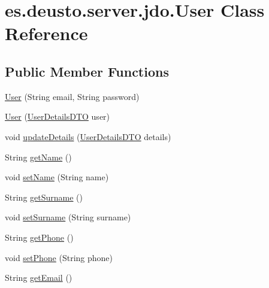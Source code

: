 \hypertarget{classes_1_1deusto_1_1server_1_1jdo_1_1_user}{}\section{es.\+deusto.\+server.\+jdo.\+User Class Reference}
\label{classes_1_1deusto_1_1server_1_1jdo_1_1_user}
\subsection*{Public Member Functions}
\begin{DoxyCompactItemize}
\item 
\mbox{\hyperlink{classes_1_1deusto_1_1server_1_1jdo_1_1_user_a3c1d7bfbedde3bad6bed8ccd3288072d}{User}} (String email, String password)
\item 
\mbox{\hyperlink{classes_1_1deusto_1_1server_1_1jdo_1_1_user_a045d3217e3e459cd505de75ebb88243e}{User}} (\mbox{\hyperlink{classes_1_1deusto_1_1server_1_1data_1_1_user_details_d_t_o}{User\+Details\+D\+TO}} user)
\item 
void \mbox{\hyperlink{classes_1_1deusto_1_1server_1_1jdo_1_1_user_a2abb7df132d0ded1f4187d900416d65d}{update\+Details}} (\mbox{\hyperlink{classes_1_1deusto_1_1server_1_1data_1_1_user_details_d_t_o}{User\+Details\+D\+TO}} details)
\item 
String \mbox{\hyperlink{classes_1_1deusto_1_1server_1_1jdo_1_1_user_ae241c2d5fbef940165041c82dc00edad}{get\+Name}} ()
\item 
void \mbox{\hyperlink{classes_1_1deusto_1_1server_1_1jdo_1_1_user_a1684a5a2d021ec4c3137a46a4e76d0c7}{set\+Name}} (String name)
\item 
String \mbox{\hyperlink{classes_1_1deusto_1_1server_1_1jdo_1_1_user_adc7114247c7881e3f9e0fd14b7905f9a}{get\+Surname}} ()
\item 
void \mbox{\hyperlink{classes_1_1deusto_1_1server_1_1jdo_1_1_user_ae429a21d0538859e2300e94ef0a9257a}{set\+Surname}} (String surname)
\item 
String \mbox{\hyperlink{classes_1_1deusto_1_1server_1_1jdo_1_1_user_a9ad4609fbf59521908115b9c49d903f4}{get\+Phone}} ()
\item 
void \mbox{\hyperlink{classes_1_1deusto_1_1server_1_1jdo_1_1_user_a2c330811de99729fb430ffe41be0540a}{set\+Phone}} (String phone)
\item 
String \mbox{\hyperlink{classes_1_1deusto_1_1server_1_1jdo_1_1_user_aa1ba6d9e3d0572b90dac6ff627ee3f95}{get\+Email}} ()
\item 

\end{DoxyCompactItemize}
